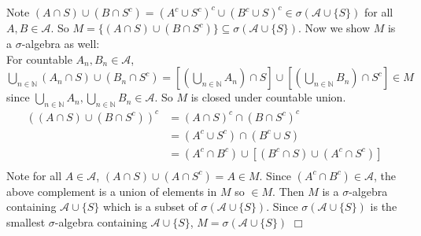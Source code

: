 \documentclass{article}
\begin{document}
\section{}
Note $(A\cap S) \cup (B \cap S^c) = \left( A^c \cup S^c \right)^c \cup \left( B^c \cup S\right)^c \in \sigma (\mathcal{A} \cup \{S\})$ for all $A,B \in \mathcal{A}$. So $M = \{ (A\cap S) \cup (B \cap S^c) \} \subseteq \sigma (\mathcal{A} \cup \{S\})$. Now we show $M$ is a $\sigma$-algebra as well:\\
For countable $A_n, B_n \in \mathcal{A}$, $\bigcup\limits_{n \in \mathbb{N}} (A_n\cap S) \cup (B_n \cap S^c) = [\left( \bigcup\limits_{n \in \mathbb{N}} A_n \right) \cap S] \cup [\left( \bigcup\limits_{n \in \mathbb{N}} B_n \right) \cap S^c] \in M$ since $\bigcup\limits_{n \in \mathbb{N}} A_n, \bigcup\limits_{n \in \mathbb{N}} B_n \in \mathcal{A}$. So $M$ is closed under countable union.
\begin{equation*}
\begin{split}
    \left( (A\cap S) \cup (B \cap S^c) \right)^c &= (A\cap S)^c \cap (B \cap S^c)^c\\
    &= (A^c \cup S^c) \cap (B^c \cup S)\\
    &= (A^c \cap B^c) \cup [(B^c \cap S) \cup (A^c \cap S^c)]\\
\end{split}
\end{equation*}
Note for all $A \in \mathcal{A}$, $(A\cap S) \cup (A \cap S^c) = A \in M$. Since $(A^c \cap B^c) \in \mathcal{A}$, the above complement is a union of elements in $M$ so $\in M$. Then $M$ is a $\sigma$-algebra containing $\mathcal{A} \cup \{S\}$ which is a subset of $\sigma (\mathcal{A} \cup \{S\})$. Since $\sigma (\mathcal{A} \cup \{S\})$ is the smallest $\sigma$-algebra containing $\mathcal{A}\cup \{S\}$, $M = \sigma (\mathcal{A} \cup \{S\})$ $\Box$
\end{document}
